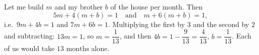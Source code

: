 Let me build $m$ and my brother $b$ of the house per month. Then
\[
5m+4(m+b)=1\quad\text{and}\quad m+6(m+b)=1,
\]
i.e.\ $9m+4b=1$ and $7m+6b=1$. Multiplying the first by $3$ and the second by $2$ and subtracting: $13m=1$, so $m=\dfrac{1}{13}$, and then $4b=1-\dfrac{9}{13}=\dfrac{4}{13}$, $b=\dfrac{1}{13}$. Each of us would take $\boxed{13\text{ months}}$ alone.
